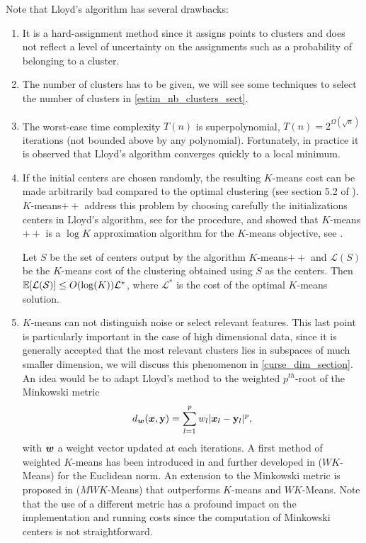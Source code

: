  Note that Lloyd's algorithm has several drawbacks: 
\begin{enumerate}
\item It is a hard-assignment method since it assigns points to clusters and does not reflect a level of uncertainty on the assignments such as a probability of belonging to a cluster.
 \item The number of clusters has to be given, we will see some techniques to select the number of clusters in \cref{estim_nb_clusters_sect}.
 \item The worst-case time complexity $T(n)$ is superpolynomial, $T(n)=2^{\Omega(\sqrt{n})}$ iterations \citep{kmeans_slow_arthur_2016} (not bounded above by any polynomial). Fortunately, in practice it is observed that Lloyd's algorithm converges quickly to a local minimum.
 \item If the initial centers are chosen randomly, the resulting $K$-means cost can be made arbitrarily bad compared to the optimal clustering (see section 5.2 of \citep{hennig2015handbook}). $K$-means$++$ \citep{Arthur:2007:KAC:1283383.1283494} address this problem by choosing carefully the initializations centers in Lloyd's algorithm, see  for the procedure, and showed that $K$-means$++$ is a $\log K$ approximation algorithm for the $K$-means objective, see .
\begin{theorem}{\citep{Arthur:2007:KAC:1283383.1283494}}
\label{kmeans++_theo}
Let $S$ be the set of centers output by the algorithm $K$-means$++$ and $\mathcal{L}(S)$ be the $K$-means cost of the clustering obtained using $S$ as the centers. Then ${\mathbb E}[\mathcal{L(S)}]\leq O(\log(K))\mathcal{L}^*$, where $\mathcal{L}^*$ is the cost of the optimal $K$-means solution. 
\end{theorem}
\item $K$-means can not distinguish noise or select relevant features. This last point is particularly important in the case of high dimensional data, since it is generally accepted that the most relevant clusters lies in subspaces of much smaller dimension, we will discuss this phenomenon in \cref{curse_dim_section}. An idea would be to adapt Lloyd's method to the weighted $p^{th}$-root of the Minkowski metric
\begin{equation}
  d_{\boldsymbol w}(\boldsymbol x,\mathbf y) = \sum_{l=1}^p w_l|\boldsymbol x_l - \mathbf y_l|^p,
\end{equation}
with $\boldsymbol w$ a weight vector updated at each iterations. A first method of weighted $K$-means has been introduced in \citep{makarenkov2001optimal} and further developed in \citep{Huang_mink_kmeans} ($WK$-Means) for the Euclidean norm. An extension to the Minkowski metric is proposed in \citep{CordeirodeAmorim:2012:MMF:2051369.2051484} ($MWK$-Means) that outperforms $K$-means and $WK$-Means. Note that the use of a different metric has a profound impact on the implementation and running costs since the computation of Minkowski centers is not straightforward.
\end{enumerate}
